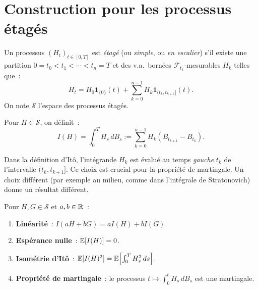 \section{Construction pour les processus \'etag\'es}

\begin{definition}
Un processus $(H_t)_{t \in [0,T]}$ est \emph{\'etag\'e} (ou \emph{simple}, ou
\emph{en escalier}) s'il existe une partition $0 = t_0 < t_1 < \cdots < t_n = T$
et des v.a.\ born\'ees $\mathcal{F}_{t_k}$-mesurables $H_k$ telles que~:
\[
  H_t = H_0 \mathbf{1}_{\{0\}}(t) + \sum_{k=0}^{n-1} H_k \mathbf{1}_{(t_k, t_{k+1}]}(t).
\]
On note $\mathcal{S}$ l'espace des processus \'etag\'es.
\end{definition}

\begin{definition}
Pour $H \in \mathcal{S}$, on d\'efinit~:
\[
  I(H) = \int_0^T H_s \, dB_s := \sum_{k=0}^{n-1} H_k (B_{t_{k+1}} - B_{t_k}).
\]
\end{definition}

\begin{attention}[title=\textbf{\'Evaluation \`a gauche}]
Dans la d\'efinition d'It\^o, l'int\'egrande $H_k$ est \'evalu\'e au temps
\emph{gauche} $t_k$ de l'intervalle $(t_k, t_{k+1}]$. Ce choix est crucial
pour la propri\'et\'e de martingale. Un choix diff\'erent (par exemple au milieu,
comme dans l'int\'egrale de Stratonovich) donne un r\'esultat diff\'erent.
\end{attention}

\begin{proposition}
\label{prop:prop_etage}
Pour $H, G \in \mathcal{S}$ et $a, b \in \mathbb{R}$~:
\begin{enumerate}
  \item \textbf{Lin\'earit\'e}~: $I(aH + bG) = aI(H) + bI(G)$.
  \item \textbf{Esp\'erance nulle}~: $\mathbb{E}[I(H)] = 0$.
  \item \textbf{Isom\'etrie d'It\^o}~:
    $\mathbb{E}[I(H)^2] = \mathbb{E}\Bigl[\int_0^T H_s^2 \, ds\Bigr]$.
  \item \textbf{Propri\'et\'e de martingale}~: le processus
    $t \mapsto \int_0^t H_s \, dB_s$ est une martingale.
\end{enumerate}
\end{proposition}

